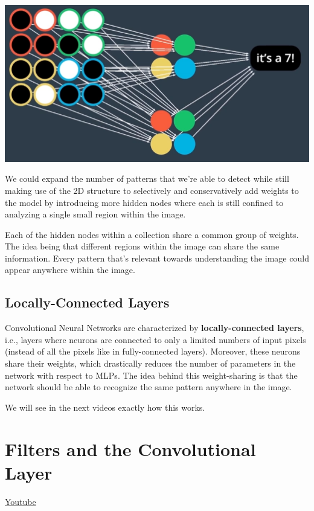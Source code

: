 \includegraphics[width=1\linewidth]{img//cnn//concepts/image4.png}

We could expand the number of patterns that we're able to detect while still making use of the 2D structure to selectively and conservatively add weights to the model by introducing more hidden nodes where each is still confined to analyzing a single small region within the image. \newline

Each of the hidden nodes within a collection share a common group of weights. The idea being that different regions within the image can share the same information. Every pattern that's relevant towards understanding the image could appear anywhere within the image.

\subsection{Locally-Connected Layers}

Convolutional Neural Networks are characterized by \textbf{locally-connected layers}, i.e., layers where neurons are connected to only a limited numbers of input pixels (instead of all the pixels like in fully-connected layers). Moreover, these neurons share their weights, which drastically reduces the number of parameters in the network with respect to MLPs. The idea behind this weight-sharing is that the network should be able to recognize the same pattern anywhere in the image. \newline

We will see in the next videos exactly how this works.

\section{Filters and the Convolutional Layer}
\href{https://www.youtube.com/watch?v=x_dhnhUzFNo&t=1s&ab_channel=Udacity}{Youtube}
